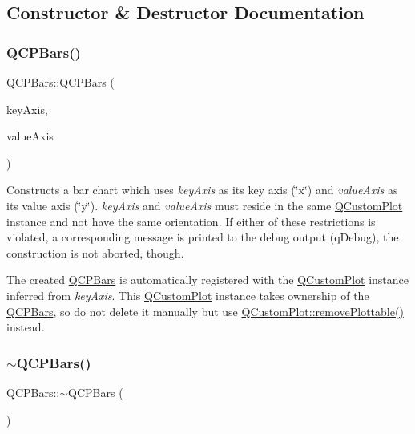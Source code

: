 \subsection{Constructor \& Destructor Documentation}
\mbox{\label{class_q_c_p_bars_a64006999ad9dff308f40df41cef176ad}} 
\subsubsection{\texorpdfstring{QCPBars()}{QCPBars()}}
{\footnotesize\ttfamily Q\+C\+P\+Bars\+::\+Q\+C\+P\+Bars (\begin{DoxyParamCaption}\item[{\mbox{\hyperlink{class_q_c_p_axis}{Q\+C\+P\+Axis}} $\ast$}]{key\+Axis,  }\item[{\mbox{\hyperlink{class_q_c_p_axis}{Q\+C\+P\+Axis}} $\ast$}]{value\+Axis }\end{DoxyParamCaption})\hspace{0.3cm}{\ttfamily [explicit]}}

Constructs a bar chart which uses {\itshape key\+Axis} as its key axis (\char`\"{}x\char`\"{}) and {\itshape value\+Axis} as its value axis (\char`\"{}y\char`\"{}). {\itshape key\+Axis} and {\itshape value\+Axis} must reside in the same \mbox{\hyperlink{class_q_custom_plot}{Q\+Custom\+Plot}} instance and not have the same orientation. If either of these restrictions is violated, a corresponding message is printed to the debug output (q\+Debug), the construction is not aborted, though.

The created \mbox{\hyperlink{class_q_c_p_bars}{Q\+C\+P\+Bars}} is automatically registered with the \mbox{\hyperlink{class_q_custom_plot}{Q\+Custom\+Plot}} instance inferred from {\itshape key\+Axis}. This \mbox{\hyperlink{class_q_custom_plot}{Q\+Custom\+Plot}} instance takes ownership of the \mbox{\hyperlink{class_q_c_p_bars}{Q\+C\+P\+Bars}}, so do not delete it manually but use \mbox{\hyperlink{class_q_custom_plot_af3dafd56884208474f311d6226513ab2}{Q\+Custom\+Plot\+::remove\+Plottable()}} instead. \mbox{\label{class_q_c_p_bars_a4d880e28031ef120603f543379be2f22}} 
\subsubsection{\texorpdfstring{$\sim$QCPBars()}{~QCPBars()}}
{\footnotesize\ttfamily Q\+C\+P\+Bars\+::$\sim$\+Q\+C\+P\+Bars (\begin{DoxyParamCaption}{ }\end{DoxyParamCaption})\hspace{0.3cm}{\ttfamily [virtual]}}



